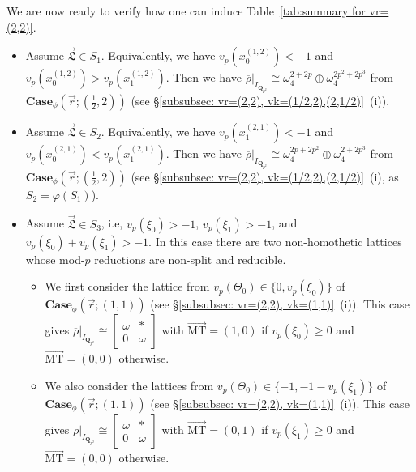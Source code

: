 \documentclass[11pt]{amsart}
\theoremstyle{definition}
\numberwithin{equation}{subsection}
\theoremstyle{plain}
\theoremstyle{plain}
\theoremstyle{plain}
\theoremstyle{plain}
\theoremstyle{plain}
\theoremstyle{plain}
\theoremstyle{plain}
\theoremstyle{plain}
\theoremstyle{plain}
\theoremstyle{plain}
\theoremstyle{plain}
\theoremstyle{plain}
\theoremstyle{definition}
\theoremstyle{definition}
\theoremstyle{definition}
\theoremstyle{remark}
\renewcommand{\(}{\textup{(}}
\renewcommand{\)}{\textup{)}}
\newcommand{\Q}{\mathbf{Q}}
\newcommand{\rhobar}{\overline{\rho}}
\newcommand{\fL}{\mathfrak{L}}
\newcommand{\vr}{\vec{r}}
\newcommand{\vL}{\vec{\fL}}
\newcommand{\IQptwo}{{I_{\Q_{p^2}}}}
\begin{document}
We are now ready to verify how one can induce Table~\ref{tab:summary for vr=(2,2)}.
\begin{itemize}[leftmargin=*]
\item Assume $\vL\in S_1$. Equivalently, we have $v_p(x_0^{(1,2)})<-1$ and $v_p(x_0^{(1,2)})>v_p(x_1^{(1,2)})$. Then we have $\rhobar|_\IQptwo\cong\omega_4^{2+2p}\oplus\omega_4^{2p^2+2p^3}$ from $\mathbf{Case}_\phi(\vr;(\frac{1}{2},2))$ (see \S\ref{subsubsec: vr=(2,2), vk=(1/2,2),(2,1/2)}~(i)).

\item Assume $\vL\in S_2$. Equivalently, we have $v_p(x_1^{(2,1)})<-1$ and $v_p(x_0^{(2,1)})<v_p(x_1^{(2,1)})$. Then we have $\rhobar|_\IQptwo\cong\omega_4^{2p+2p^2}\oplus\omega_4^{2+2p^3}$ from $\mathbf{Case}_\phi(\vr;(\frac{1}{2},2))$ (see \S\ref{subsubsec: vr=(2,2), vk=(1/2,2),(2,1/2)}~(i), as $S_2=\varphi(S_1)$).

\item Assume $\vL\in S_3$, i.e, $v_p(\xi_0)>-1$, $v_p(\xi_1)>-1$, and $v_p(\xi_0)+v_p(\xi_1)>-1$. In this case there are two non-homothetic lattices whose mod-$p$ reductions are non-split and reducible.
    \begin{itemize}[leftmargin=*]
        \item We first consider the lattice from $v_p(\Theta_0)\in\{0,v_p(\xi_0)\}$ of $\mathbf{Case}_\phi(\vr;(1,1))$ (see \S\ref{subsubsec: vr=(2,2), vk=(1,1)}~(i)). This case gives $\rhobar|_\IQptwo\cong
        \begin{bmatrix}
            \omega & * \\ 0 & \omega
        \end{bmatrix}$ with $\vec{\mathrm{MT}}=(1,0)$ if $v_p(\xi_0)\geq 0$ and $\vec{\mathrm{MT}}=(0,0)$ otherwise.
        \item We also consider the lattices from $v_p(\Theta_0)\in\{-1,-1-v_p(\xi_1)\}$ of $\mathbf{Case}_\phi(\vr;(1,1))$ (see \S\ref{subsubsec: vr=(2,2), vk=(1,1)}~(i)). This case gives $\rhobar|_\IQptwo\cong
        \begin{bmatrix}
            \omega & * \\ 0 & \omega
        \end{bmatrix}$ with $\vec{\mathrm{MT}}=(0,1)$ if $v_p(\xi_1)\geq 0$ and $\vec{\mathrm{MT}}=(0,0)$ otherwise.
    \end{itemize}


\end{itemize}
\end{document}
